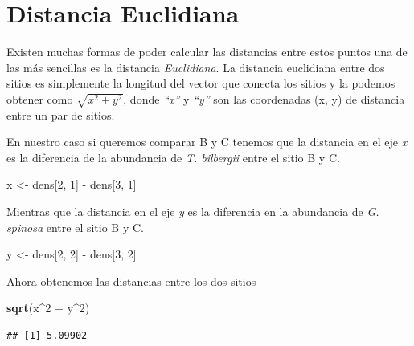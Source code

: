 \documentclass[]{book}
\newenvironment{Shaded}{\begin{snugshade}}{\end{snugshade}}
\newcommand{\KeywordTok}[1]{\textcolor[rgb]{0.13,0.29,0.53}{\textbf{{#1}}}}
\newcommand{\DecValTok}[1]{\textcolor[rgb]{0.00,0.00,0.81}{{#1}}}
\newcommand{\StringTok}[1]{\textcolor[rgb]{0.31,0.60,0.02}{{#1}}}
\newcommand{\NormalTok}[1]{{#1}}
\begin{document}
\section{Distancia Euclidiana}\label{distancia-euclidiana}

Existen muchas formas de poder calcular las distancias entre estos
puntos una de las más sencillas es la distancia \emph{Euclidiana}. La
distancia euclidiana entre dos sitios es simplemente la longitud del
vector que conecta los sitios y la podemos obtener como
\(\sqrt{x^2+y^2}\), donde \emph{``x''} y \emph{``y''} son las
coordenadas (x, y) de distancia entre un par de sitios.

En nuestro caso si queremos comparar B y C tenemos que la distancia en
el eje \emph{x} es la diferencia de la abundancia de \emph{T. bilbergii}
entre el sitio B y C.

\begin{Shaded}
\begin{Highlighting}[]
\NormalTok{x <-}\StringTok{ }\NormalTok{dens[}\DecValTok{2}\NormalTok{, }\DecValTok{1}\NormalTok{] -}\StringTok{ }\NormalTok{dens[}\DecValTok{3}\NormalTok{, }\DecValTok{1}\NormalTok{]}
\end{Highlighting}
\end{Shaded}

Mientras que la distancia en el eje \emph{y} es la diferencia en la
abundancia de \emph{G. spinosa} entre el sitio B y C.

\begin{Shaded}
\begin{Highlighting}[]
\NormalTok{y <-}\StringTok{ }\NormalTok{dens[}\DecValTok{2}\NormalTok{, }\DecValTok{2}\NormalTok{] -}\StringTok{ }\NormalTok{dens[}\DecValTok{3}\NormalTok{, }\DecValTok{2}\NormalTok{]}
\end{Highlighting}
\end{Shaded}

Ahora obtenemos las distancias entre los dos sitios

\begin{Shaded}
\begin{Highlighting}[]
\KeywordTok{sqrt}\NormalTok{(x^}\DecValTok{2} \NormalTok{+}\StringTok{ }\NormalTok{y^}\DecValTok{2}\NormalTok{)}
\end{Highlighting}
\end{Shaded}

\begin{verbatim}
## [1] 5.09902
\end{verbatim}
\end{document}
